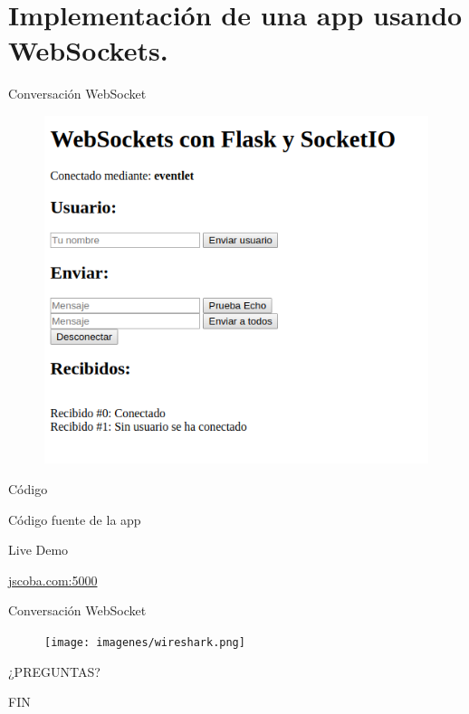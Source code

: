 \documentclass[usenames,dvipsnames]{beamer}
\begin{document}
\section{Implementación de una app usando WebSockets. }
\begin{frame}{Conversación WebSocket }

\begin{figure}[H]
\centering
\includegraphics[scale=0.5]{imagenes/app.png}
\end{figure}
\end{frame}

\begin{frame}{Código}

	\begin{center}
	\huge{Código fuente de la app}
	\end{center}
	
\end{frame}

\begin{frame}{Live Demo}

	\begin{center}
	\huge{\url{jscoba.com:5000}}
	\end{center}
	
\end{frame}

\begin{frame}{Conversación WebSocket }

\begin{figure}[H]
\centering
\texttt{[image: imagenes/wireshark.png]}
\end{figure}
\end{frame}


\begin{frame}[standout]
  ¿PREGUNTAS?
\end{frame}

\begin{frame}[standout]
  FIN
\end{frame}
\end{document}
